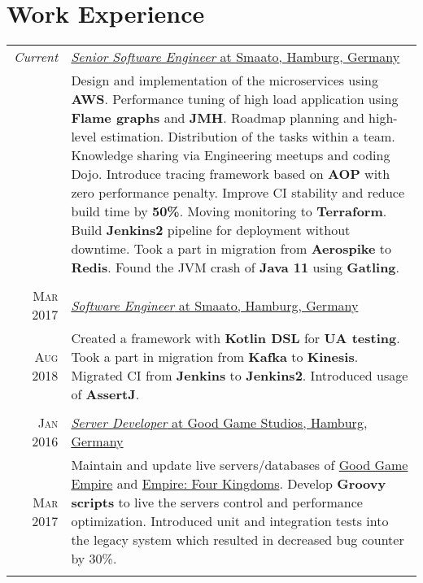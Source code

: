 \documentclass[a4paper,10pt]{article} %
\begin{document}

\section{Work Experience}

\begin{tabular}{r|p{11cm}}


\emph{Current}	&	\underline{\emph{Senior Software Engineer} at \href{https://www.smaato.com/company/}{Smaato}, Hamburg, Germany }\\
				&	\small{
						Design and implementation of the microservices using \textbf{AWS}.
						Performance tuning of high load application using \textbf{Flame graphs} and \textbf{JMH}.
						Roadmap planning and high-level estimation. Distribution of the tasks within a team.
						Knowledge sharing via Engineering meetups and coding Dojo.
						Introduce tracing framework based on \textbf{AOP} with zero performance penalty.
						Improve CI stability and reduce build time by \textbf{50\%}.
						Moving monitoring to \textbf{Terraform}.
						Build \textbf{Jenkins2} pipeline for deployment without downtime.
						Took a part in migration from \textbf{Aerospike} to \textbf{Redis}.
						Found the JVM crash of \textbf{Java 11} using \textbf{Gatling}.
					} \\
\multicolumn{2}{c}{} \\


\textsc{Mar 2017} & 	\underline{\emph{Software Engineer} at \href{https://www.smaato.com/company/}{Smaato}, Hamburg, Germany }\\
\textsc{Aug 2018} & 	\small{
						Created a framework with  \textbf{Kotlin DSL} for \textbf{UA testing}.
						Took a part in migration from \textbf{Kafka} to \textbf{Kinesis}.
						Migrated CI from \textbf{Jenkins} to \textbf{Jenkins2}. Introduced usage of \textbf{AssertJ}.
					}\\
\multicolumn{2}{c}{} \\


\textsc{Jan 2016}	&	\underline{\emph{Server Developer} at \href{https://www.goodgamestudios.com/}{Good Game Studios}, Hamburg, Germany} \\
\textsc{Mar 2017}	& 	\small{
						Maintain and update live servers/databases of \href{https://empire.goodgamestudios.com/}{Good Game Empire} 
						and  \href{https://www.goodgamestudios.com/games/empire-four-kingdoms-app/}{ Empire: Four Kingdoms}.  
						Develop  \textbf{Groovy scripts} to live the servers control and performance optimization. 
						Introduced unit and integration tests into the legacy system which resulted in decreased bug counter by 30\%. 
					} \\
\multicolumn{2}{c}{} \\



\end{tabular}
\end{document}
